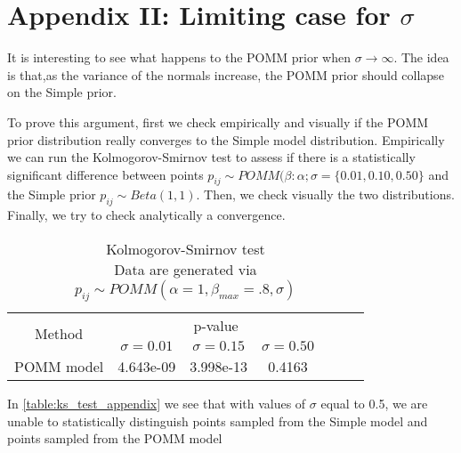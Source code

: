 \documentclass[11pt]{amsart}
\begin{document}
\section{Appendix II: Limiting case for $\sigma$}

It is interesting to see what happens to the POMM prior when $\sigma \rightarrow \infty$. The idea is that,as the variance of the normals increase, the POMM prior should collapse on the Simple prior. 

To prove this argument, first we check empirically and visually if the POMM prior distribution really converges to the Simple model distribution. Empirically we can run the Kolmogorov-Smirnov test to assess if there is a statistically significant difference between points $p_{ij} \sim POMM(\beta:\alpha;\sigma = \{0.01,0.10,0.50\}$ and the Simple prior $p_{ij} \sim Beta(1,1)$. Then, we check visually the two distributions. Finally, we try to check analytically a convergence.


\begin{table}[htbp]
\centering
\caption{
{\large Kolmogorov-Smirnov test} \\ 
{\small Data are generated via $p_{ij} \sim POMM(\alpha=1,\beta_{max}=.8,\sigma)$} }
\begin{tabular}{ccccccc}
\toprule
\multirow{2}{*}{Method} & \multicolumn{3}{c}{
p-value}  \\
\cmidrule(lr){2-4} \cmidrule(lr){5-7}
& $\sigma = 0.01$ & $\sigma = 0.15$  & $\sigma = 0.50$    \\
\midrule
POMM model  &4.643e-09& 3.998e-13 & 0.4163 \\
\bottomrule
\end{tabular}
\label{table:ks_test_appendix}
\end{table}

In \eqref{table:ks_test_appendix} we see that with values of $\sigma$ equal to 0.5, we are unable to statistically distinguish points sampled from the Simple model and points sampled from the POMM model
\end{document}
